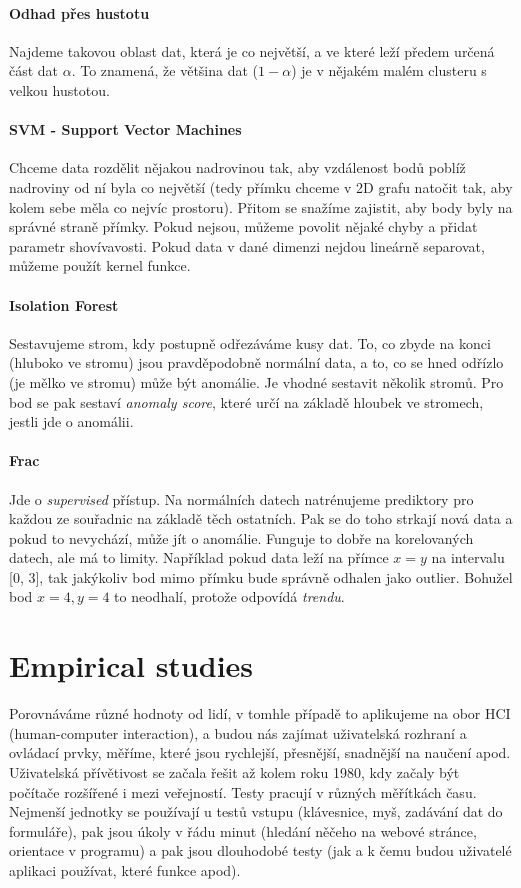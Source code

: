 \paragraph{Odhad přes hustotu} Najdeme takovou oblast dat, která je co největší, a ve které leží předem určená část dat $\alpha$. To znamená, že většina dat ($1 - \alpha$) je v nějakém malém clusteru s velkou hustotou.

\paragraph{SVM - Support Vector Machines} Chceme data rozdělit nějakou nadrovinou tak, aby vzdálenost bodů poblíž nadroviny od ní byla co největší (tedy přímku chceme v 2D grafu natočit tak, aby kolem sebe měla co nejvíc prostoru). Přitom se snažíme zajistit, aby body byly na správné straně přímky. Pokud nejsou, můžeme povolit nějaké chyby a přidat parametr shovívavosti. Pokud data v dané dimenzi nejdou lineárně separovat, můžeme použít kernel funkce.

\paragraph{Isolation Forest} Sestavujeme strom, kdy postupně odřezáváme kusy dat. To, co zbyde na konci (hluboko ve stromu) jsou pravděpodobně normální data, a to, co se hned odřízlo (je mělko ve stromu) může být anomálie. Je vhodné sestavit několik stromů. Pro bod se pak sestaví \textit{anomaly score}, které určí na základě hloubek ve stromech, jestli jde o anomálii.

\paragraph{Frac} Jde o \textit{supervised} přístup. Na normálních datech natrénujeme prediktory pro každou ze souřadnic na základě těch ostatních. Pak se do toho strkají nová data a pokud to nevychází, může jít o anomálie. Funguje to dobře na korelovaných datech, ale má to limity. Například pokud data leží na přímce $x=y$ na intervalu [0, 3], tak jakýkoliv bod mimo přímku bude správně odhalen jako outlier. Bohužel bod $x=4, y=4$ to neodhalí, protože odpovídá \textit{trendu}.


\section{Empirical studies}

Porovnáváme různé hodnoty od lidí, v tomhle případě to aplikujeme na obor HCI (human-computer interaction), a budou nás zajímat uživatelská rozhraní a ovládací prvky, měříme, které jsou rychlejší, přesnější, snadnější na naučení apod. Uživatelská přívětivost se začala řešit až kolem roku 1980, kdy začaly být počítače rozšířené i mezi veřejností. Testy pracují v různých měřítkách času. Nejmenší jednotky se používají u testů vstupu (klávesnice, myš, zadávání dat do formuláře), pak jsou úkoly v řádu minut   (hledání něčeho na webové stránce, orientace v programu) a pak jsou dlouhodobé testy (jak a k čemu budou uživatelé aplikaci používat, které funkce apod). 


